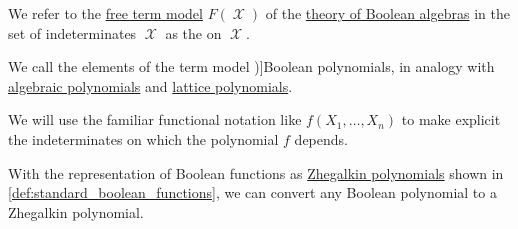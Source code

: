 \begin{definition}\label{def:free_boolean_algebra}
  We refer to the \hyperref[def:fol_free_term_model]{free term model} \( F(\mscrX) \) of the \hyperref[def:boolean_algebra/theory]{theory of Boolean algebras} in the set of indeterminates \( \mscrX \) as the  on \( \mscrX \).

  \begin{thmenum}
    \mimprovised We call the elements of the term model \term[en=Boolean polynomial (\cite[20]{HalmosGivant2009BooleanAlgebras})]{Boolean polynomials}, in analogy with \hyperref[def:polynomial_algebra/polynomials]{algebraic polynomials} and \hyperref[def:free_lattice/polynomial]{lattice polynomials}.

    We will use the familiar functional notation like \( f(X_1, \ldots, X_n) \) to make explicit the indeterminates on which the polynomial \( f \) depends.
  \end{thmenum}
\end{definition}
\begin{comments}
  \item With the representation of Boolean functions as \hyperref[def:zhegalkin_polynomial]{Zhegalkin polynomials} shown in \cref{def:standard_boolean_functions}, we can convert any Boolean polynomial to a Zhegalkin polynomial.
\end{comments}

